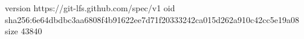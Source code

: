 version https://git-lfs.github.com/spec/v1
oid sha256:6e64dbdbc3aa6808f4b91622ee7d71f20333242ca015d262a910c42cc5e19a08
size 43840
